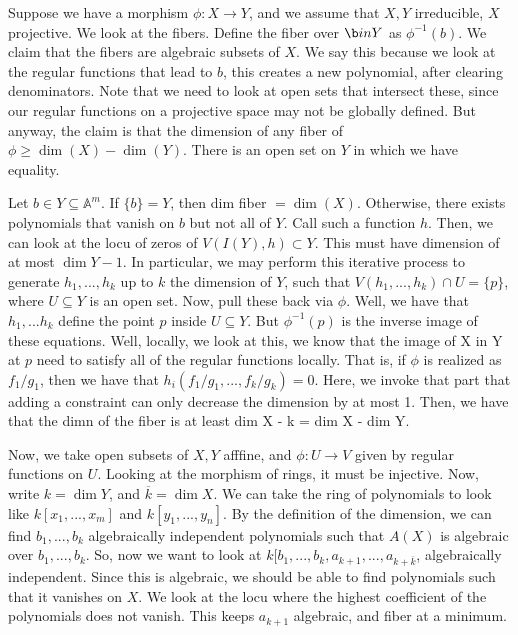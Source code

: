 \documentclass[10pt]{article}
\begin{document}
Suppose we have a morphism $\phi: X \to Y$, and we assume that $X,Y$ irreducible, $X$ projective. We look at the fibers. Define the fiber over $\b in Y$ as $\phi^{-1}(b)$. We claim that the fibers are algebraic subsets of $X$. We say this because we look at the regular functions that lead to $b$, this creates a new polynomial, after clearing denominators. Note that we need to look at open sets that intersect these, since our regular functions on a projective space may not be globally defined. But anyway, the claim is that the dimension of any fiber of $\phi \geq \dim(X) - \dim(Y)$. There is an open set on $Y$ in which we have equality.

Let $b \in Y \subseteq \mathbb{A}^m$. If $\{ b \} = Y$, then dim fiber $= \dim(X)$. Otherwise, there exists polynomials that vanish on $b$ but not all of $Y$. Call such a function $h$. Then, we can look at the locu of zeros of $V(I(Y),h) \subset Y$. This must have dimension of at most $\dim Y - 1$. In particular, we may perform this iterative process to generate $h_1,...,h_k$ up to $k$ the dimension of $Y$, such that $V(h_1,...,h_k) \cap U = \{ p \}$, where $U \subseteq Y$ is an open set. Now, pull these back via $\phi$. Well, we have that $h_1,...h_k$ define the point $p$ inside $U \subseteq Y$. But $\phi^{-1}(p)$ is the inverse image of these equations. Well, locally, we look at this, we know that the image of X in Y at $p$ need to satisfy all of the regular functions locally. That is, if $\phi$ is realized as $f_1/g_1$, then we have that $h_i(f_1/g_1,...,f_k/g_k) = 0$. Here, we invoke that part that adding a constraint can only decrease the dimension by at most 1. Then, we have that the dimn of the fiber is at least dim X - k = dim X - dim Y.

Now, we take open subsets of $X,Y$ afffine, and $\phi: U \to V$ given by regular functions on $U$. Looking at the morphism of rings, it must be injective. Now, write $k = \dim Y$, and $\overline{k} = \dim X$. We can take the ring of polynomials to look like $k[x_1,...,x_m]$ and $k[y_1,...,y_n]$. By the definition of the dimension, we can find $b_1,...,b_k$ algebraically independent polynomials such that $A(X)$ is algebraic over $b_1,...,b_k$. So, now we want to look at $k[b_1,...,b_k,a_{k+1},...,a_{k+\overline{k}}$, algebraically independent. Since this is algebraic, we should be able to find polynomials such that it vanishes on $X$. We look at the locu where the highest coefficient of the polynomials does not vanish. This keeps $a_{k+1}$ algebraic, and fiber at a minimum.
\end{document}
